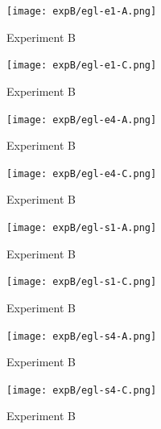 \documentclass[twoside]{ctuthesis}
\theoremstyle{plain}
\theoremstyle{definition}
\theoremstyle{note}
\begin{document}
\begin{figure}[htbp]
	\centering
	\texttt{[image: expB/egl-e1-A.png]}
	\caption{Experiment B}
	\label{fig:your-figure}
\end{figure}
\begin{figure}[htbp]
	\centering
	\texttt{[image: expB/egl-e1-C.png]}
	\caption{Experiment B}
	\label{fig:your-figure}
\end{figure}
\begin{figure}[htbp]
	\centering
	\texttt{[image: expB/egl-e4-A.png]}
	\caption{Experiment B}
	\label{fig:your-figure}
\end{figure}
\begin{figure}[htbp]
	\centering
	\texttt{[image: expB/egl-e4-C.png]}
	\caption{Experiment B}
	\label{fig:your-figure}
\end{figure}
\begin{figure}[htbp]
	\centering
	\texttt{[image: expB/egl-s1-A.png]}
	\caption{Experiment B}
	\label{fig:your-figure}
\end{figure}
\begin{figure}[htbp]
	\centering
	\texttt{[image: expB/egl-s1-C.png]}
	\caption{Experiment B}
	\label{fig:your-figure}
\end{figure}
\begin{figure}[htbp]
	\centering
	\texttt{[image: expB/egl-s4-A.png]}
	\caption{Experiment B}
	\label{fig:your-figure}
\end{figure}
\begin{figure}[htbp]
	\centering
	\texttt{[image: expB/egl-s4-C.png]}
	\caption{Experiment B}
	\label{fig:your-figure}
\end{figure}
\end{document}

